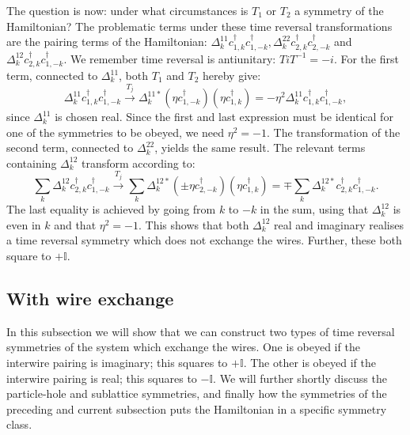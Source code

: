 The question is now: under what circumstances is $T_1$ or $T_2$ a symmetry of the Hamiltonian? The problematic terms under these time reversal transformations are the pairing terms of the Hamiltonian: $\Delta^{11}_k c^\dagger_{1,k}c^\dagger_{1,-k}, \Delta^{22}_k c^\dagger_{2,k}c^\dagger_{2,-k}$ and $\Delta^{12}_kc^\dagger_{2,k}c^\dagger_{1,-k}$. We remember time reversal is antiunitary: $TiT^{-1} = -i$. For the first term, connected to $\Delta^{11}_k$, both $T_1$ and $T_2$ hereby give:
\begin{equation}
\Delta^{11}_k c^\dagger_{1,k}c^\dagger_{1,-k} \overset{T_j}{\to} \Delta^{11*}_k \left(\eta c^\dagger_{1,-k}\right)\left(\eta c^\dagger_{1,k}\right) = -\eta^2\Delta^{11}_k c^\dagger_{1,k}c^\dagger_{1,-k}, \nonumber
\end{equation}
since $\Delta^{11}_k$ is chosen real. Since the first and last expression must be identical for one of the symmetries to be obeyed, we need $\eta^2 = -1$. The transformation of the second term, connected to $\Delta^{22}_k$, yields the same result. The relevant terms containing $\Delta^{12}_k$ transform according to:
\begin{equation}
\sum_k \Delta^{12}_k c^\dagger_{2,k}c^\dagger_{1,-k} \overset{T_j}{\to} \sum_k \Delta^{12*}_k \left(\pm \eta c^\dagger_{2,-k}\right)\left( \eta c^\dagger_{1,k}\right) = \mp \sum_k \Delta^{12*}_{k} c^\dagger_{2,k}c^\dagger_{1,-k}. \nonumber
\end{equation}
The last equality is achieved by going from $k$ to $-k$ in the sum, using that $\Delta^{12}_k$ is even in $k$ and that $\eta^2 = -1$. This shows that both $\Delta^{12}_k$ real and imaginary realises a time reversal symmetry which does not exchange the wires. Further, these both square to $ + \mathbb{I}$.

\subsection{With wire exchange}
\label{subsec.TRwireexchange}
In this subsection we will show that we can construct two types of time reversal symmetries of the system which exchange the wires. One is obeyed if the interwire pairing is imaginary; this squares to $+\mathbb{I}$. The other is obeyed if the interwire pairing is real; this squares to $-\mathbb{I}$. We will further shortly discuss the particle-hole and sublattice symmetries, and finally how the symmetries of the preceding and current subsection puts the Hamiltonian in a specific symmetry class. 

